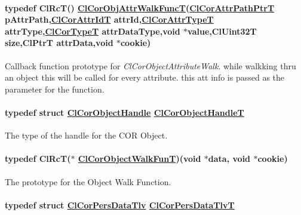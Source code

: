 \hypertarget{group__group13_ga35}{
\paragraph[ClCorObjAttrWalkFuncT]{\setlength{\rightskip}{0pt plus 5cm}typedef Cl\-Rc\-T() \hyperlink{group__group13_ga35}{Cl\-Cor\-Obj\-Attr\-Walk\-Func\-T}(\hyperlink{struct_cl_cor_attr_path}{Cl\-Cor\-Attr\-Path\-Ptr\-T} p\-Attr\-Path,\hyperlink{group__group13_ga3}{Cl\-Cor\-Attr\-Id\-T} attr\-Id,\hyperlink{group__group13_ga10}{Cl\-Cor\-Attr\-Type\-T} attr\-Type,\hyperlink{group__group13_ga9}{Cl\-Cor\-Type\-T} attr\-Data\-Type,void $\ast$value,Cl\-Uint32T size,Cl\-Ptr\-T attr\-Data,void $\ast$cookie)}\hfill}
\label{group__group13_ga35}


Callback function prototype for {\em Cl\-Cor\-Object\-Attribute\-Walk\/}. while walkking thru an object this will be called for every attribute. this att info is passed as the parameter for the function. \hypertarget{group__group13_ga15}{
\paragraph[ClCorObjectHandleT]{\setlength{\rightskip}{0pt plus 5cm}typedef struct \hyperlink{struct_cl_cor_object_handle}{Cl\-Cor\-Object\-Handle} \hyperlink{struct_cl_cor_object_handle}{Cl\-Cor\-Object\-Handle\-T}}\hfill}
\label{group__group13_ga15}


The type of the handle for the COR Object. \hypertarget{group__group13_ga53}{
\paragraph[ClCorObjectWalkFunT]{\setlength{\rightskip}{0pt plus 5cm}typedef Cl\-Rc\-T($\ast$ \hyperlink{group__group13_ga53}{Cl\-Cor\-Object\-Walk\-Fun\-T})(void $\ast$data, void $\ast$cookie)}\hfill}
\label{group__group13_ga53}


The prototype for the Object Walk Function. \hypertarget{group__group13_ga62}{
\paragraph[ClCorPersDataTlvT]{\setlength{\rightskip}{0pt plus 5cm}typedef struct \hyperlink{struct_cl_cor_pers_data_tlv}{Cl\-Cor\-Pers\-Data\-Tlv} \hyperlink{struct_cl_cor_pers_data_tlv}{Cl\-Cor\-Pers\-Data\-Tlv\-T}}\hfill}
\label{group__group13_ga62}


